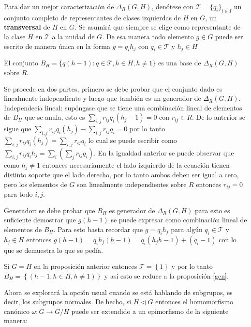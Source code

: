 Para dar un mejor caracterización de $\Delta_R (G,H)$, denótese con $\mathcal{T} = \{q_i\}_{i \in I}$ un conjunto completo de representantes de clases izquierdas de $H$ en $G$, un \textbf{transversal} de $H$ en $G$. Se asumirá que siempre se elige como representante de la clase $H$ en $\mathcal{T}$ a la unidad de $G$. De esa manera todo elemento $g \in G$ puede ser escrito de manera única en la forma $g = q_ih_j$ con $q_i \in \mathcal{T}$ y $h_j \in H$
\begin{proposicion}
El conjunto $B_H = \{q(h-1) : q \in \mathcal{T}, h \in H, h \neq 1  \}$ es una base de $\Delta_R(G,H)$ sobre $R$.
\end{proposicion} 
\begin{proof*}
Se procede en dos partes, primero se debe probar que el conjunto dado es linealmente independiente y luego que también es un generador de $\Delta_R(G,H)$. 
Independecia lineal: supóngase que se tiene una combinación lineal de elementos de $B_H$ que se anula, esto es $\sum_{i,j}r_{ij}q_i(h_j-1) =0 $ con $r_{ij} \in R$. De lo anterior se sigue que $\sum_{i,j}r_{ij}q_i(h_j)-\sum_{i,j}r_{ij}q_i = 0$ por lo tanto $ \sum_{i,j}r_{ij}q_i(h_j) = \sum_{i,j}r_{ij}q_i $ lo cual se puede escribir como $\sum_{i,j}r_{ij}q_ih_j =  \sum_i\left( \sum_jr_{ij}q_i \right)$. En la igualdad anterior se puede observar que como $h_j \neq 1$ entonces necesariamente el lado izquierdo de la ecuación tienen distinto soporte que el lado derecho, por lo tanto ambos deben ser igual a cero, pero los elementos de $G$ son linealmente independientes sobre $R$ entonces $r_{ij} = 0$  para todo $i,j$.

Generador: se debe probar que $B_H$ es generador de $\Delta_R(G,H)$ para esto es suficiente demostrar que $g(h-1)$  se puede expresar  como combinación lineal de elementos de $B_H$. Para esto basta recordar que $g = q_ih_j$ para algún $q_i \in \mathcal{T}$ y $h_j \in H$ entonces $g(h-1) = q_ih_j(h-1) = q_i(h_jh-1)+ (q_i-1) $ con lo que se demuestra lo que se pedía. 
\end{proof*}
\begin{nota}
Si $G=H$ en la proposición anterior entonces $\mathcal{T} = \left\{ 1 \right\}$ y por lo tanto $B_H = \left\{ (h-1 , h \in H, h \neq 1) \right\}$ y así esto se reduce a la proposición \ref{gen}. 
\end{nota}
Ahora se explorará la opción usual cuando se está hablando de subgrupos, es decir, los subgrupos normales. De hecho, si $H \lhd G$ entonces el homomorfismo canónico $\omega : G \to G/H$ puede ser extendido a un epimorfismo de la siguiente manera: 
